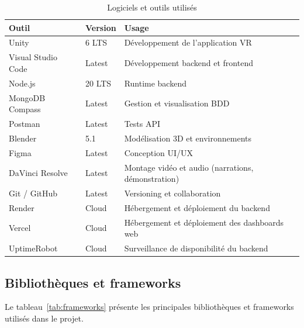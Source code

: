 \begin{table}[H]
  \centering
  \begin{tabularx}{\textwidth}{llX}
    \toprule
    \textbf{Outil} & \textbf{Version} & \textbf{Usage} \\
    \midrule
    Unity          & 6 LTS            & Développement de l'application VR \\
    Visual Studio Code & Latest       & Développement backend et frontend \\
    Node.js        & 20 LTS           & Runtime backend \\
    MongoDB Compass & Latest          & Gestion et visualisation BDD \\
    Postman        & Latest           & Tests API \\
    Blender        & 5.1              & Modélisation 3D et environnements \\
    Figma          & Latest           & Conception UI/UX \\
    DaVinci Resolve & Latest          & Montage vidéo et audio (narrations, démonstration) \\
    Git / GitHub   & Latest           & Versioning et collaboration \\
    Render         & Cloud            & Hébergement et déploiement du backend \\
    Vercel         & Cloud            & Hébergement et déploiement des dashboards web \\
    UptimeRobot    & Cloud            & Surveillance de disponibilité du backend \\
    \bottomrule
  \end{tabularx}
  \caption{Logiciels et outils utilisés}
  \label{tab:software}
\end{table}

\subsection{Bibliothèques et frameworks}

Le tableau~\ref{tab:frameworks} présente les principales bibliothèques et frameworks
utilisés dans le projet.

